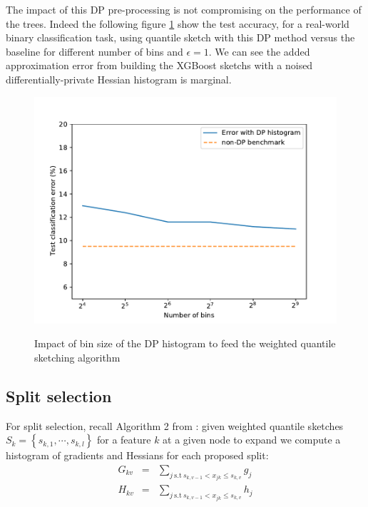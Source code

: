 \documentclass{article}
\theoremstyle{definition}
\begin{document}
The impact of this DP pre-processing is not compromising on the performance of the trees. Indeed the following figure \ref{sketchAccuracy2} show the test accuracy, for a real-world binary classification task, using quantile sketch with this DP method versus the baseline for different number of bins and $\epsilon = 1$. We can see the added approximation error from building the XGBoost sketchs with a noised differentially-private Hessian histogram is marginal. \smallskip 

\begin{figure}[h]
\centering 
\includegraphics[scale=0.7]{figs/plot_accuracy_bins.pdf}
\label{sketchAccuracy2}
\caption{Impact of bin size of the DP histogram to feed the weighted quantile sketching algorithm} 
\end{figure}

\subsection{Split selection}

For split selection, recall Algorithm 2 from \cite{chen2016xgboost}: given weighted quantile sketches $S_k = \left\{ s_{k,1}, \cdots, s_{k,l} \right\} $ for a feature $k$ at a given node to expand we compute a histogram of gradients and Hessians for each proposed split: 
\begin{eqnarray*} 
G_{kv} &=& \sum_{j\ \text{s.t}\ s_{k,v-1} < x_{jk} \leq s_{k,v} } g_j \\
H_{kv} &=& \sum_{j\ \text{s.t}\ s_{k,v-1} < x_{jk} \leq s_{k,v} } h_j 
\end{eqnarray*}
\end{document}

